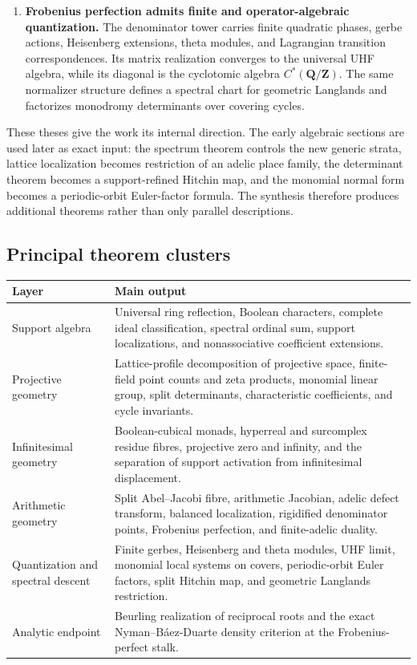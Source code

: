 \documentclass[11pt]{amsart}
\numberwithin{equation}{section}
\theoremstyle{definition}
\newcommand{\Z}{\mathbf Z}
\newcommand{\Q}{\mathbf Q}
\begin{document}
\begin{enumerate}[label=\textbf{T\arabic*.},leftmargin=3.8em]
\item \textbf{Frobenius perfection admits finite and operator-algebraic
quantization.}
The denominator tower carries finite quadratic phases, gerbe actions,
Heisenberg extensions, theta modules, and Lagrangian transition
correspondences.  Its matrix realization converges to the universal UHF
algebra, while its diagonal is the cyclotomic algebra
$C^*(\Q/\Z)$.  The same normalizer structure defines a spectral chart for
geometric Langlands and factorizes monodromy determinants over covering
cycles.
\end{enumerate}

These theses give the work its internal direction.  The early algebraic
sections are used later as exact input: the spectrum theorem controls the
new generic strata, lattice localization becomes restriction of an adelic
place family, the determinant theorem becomes a support-refined Hitchin
map, and the monomial normal form becomes a periodic-orbit Euler-factor
formula.  The synthesis therefore produces additional theorems rather than
only parallel descriptions.

\subsection*{Principal theorem clusters}

\begin{center}
\renewcommand{\arraystretch}{1.25}
\begin{tabular}{>{\raggedright\arraybackslash}p{}>{\raggedright\arraybackslash}p{}}
\toprule
\textbf{Layer} & \textbf{Main output}\\
\midrule
Support algebra & Universal ring reflection, Boolean characters, complete
ideal classification, spectral ordinal sum, support localizations, and
nonassociative coefficient extensions.\\
Projective geometry & Lattice-profile decomposition of projective space,
finite-field point counts and zeta products, monomial linear group, split
determinants, characteristic coefficients, and cycle invariants.\\
Infinitesimal geometry & Boolean-cubical monads, hyperreal and surcomplex
residue fibres, projective zero and infinity, and the separation of support
activation from infinitesimal displacement.\\
Arithmetic geometry & Split Abel--Jacobi fibre, arithmetic Jacobian,
adelic defect transform, balanced localization, rigidified denominator
points, Frobenius perfection, and finite-adelic duality.\\
Quantization and spectral descent & Finite gerbes, Heisenberg and theta
modules, UHF limit, monomial local systems on covers, periodic-orbit Euler
factors, split Hitchin map, and geometric Langlands restriction.\\
Analytic endpoint & Beurling realization of reciprocal roots and the exact
Nyman--B\'aez-Duarte density criterion at the Frobenius-perfect stalk.\\
\bottomrule
\end{tabular}
\end{center}
\end{document}
